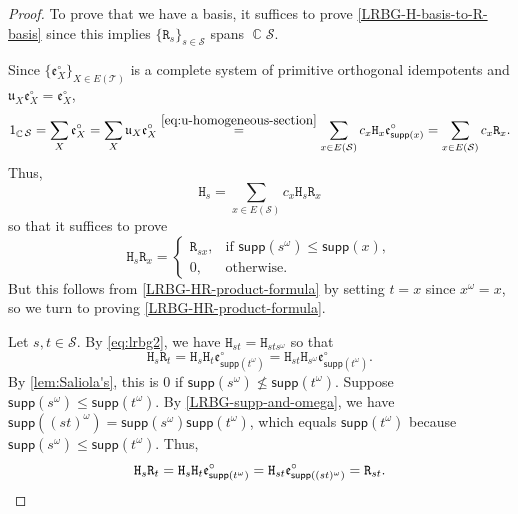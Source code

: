 \documentclass[11pt, oneside, reqno]{amsart}
\theoremstyle{definition}
\numberwithin{equation}{section}
\DeclareMathOperator{\C}{\mathbb{C}}
\def \SS{{\mathcal{S}}}
\def \TT{{\mathcal{T}}}
\def \kk{\C}
\def \uu{{\mathfrak{u}}}
\def \ee{{\mathfrak{e}}}
\def \supp{\mathsf{supp}}
\newcommand{\B}[1]{\mathtt{#1}} 			%
\begin{document}
\begin{proof}
    To prove that we have a basis, it suffices to prove
    \cref{LRBG-H-basis-to-R-basis} since this implies $\{\B{R}_s\}_{ s \in \SS}$
    spans $\kk\SS$.

    Since $\{\ee^\circ_{X}\}_{X \in E(\TT)}$ is a complete system of primitive orthogonal idempotents
    and $\uu_{X} \ee^\circ_{X} = \ee^\circ_{X}$,
    \begin{equation*}
        1_{\kk\SS}
        = \sum_{X} \ee^\circ_{X}
        = \sum_{X} \uu_{X} \ee^\circ_{X}
        \overset{\cref{eq:u-homogeneous-section}}{=}
        \sum_{x \in E(\SS)} c_x \B{H}_{x} \ee^\circ_{\supp(x)}
        =
        \sum_{x \in E(\SS)} c_x \B{R}_{x}.
    \end{equation*}
    Thus,
    \begin{equation*}
        \B{H}_{s}
        = \sum_{x \in E(\SS)} c_x \B{H}_{s} \B{R}_{x}
    \end{equation*}
    so that it suffices to prove
    \begin{equation*}
        \B{H}_{s} \B{R}_{x} =
        \begin{cases}
            \B{R}_{sx}, & \text{if~} \supp(s^\omega) \leq \supp(x), \\
            0, & \text{otherwise}.
        \end{cases}
    \end{equation*}
    But this follows from \cref{LRBG-HR-product-formula} by setting $t = x$
    since $x^\omega = x$, so we turn to proving \cref{LRBG-HR-product-formula}.

    Let $s, t \in \SS$.
    By \cref{eq:lrbg2}, we have $\B{H}_{s t} = \B{H}_{s t s^\omega}$
    so that
    \begin{equation*}
        \B{H}_{s} \B{R}_{t}
        =
        \B{H}_{s} \B{H}_{t} \ee^\circ_{\supp(t^\omega)}
        =
        \B{H}_{st} \B{H}_{s^\omega} \ee^\circ_{\supp(t^\omega)}.
    \end{equation*}
    By \cref{lem:Saliola's},
    this is $0$ if $\supp(s^\omega) \not\leq \supp(t^\omega)$.
    Suppose $\supp(s^\omega) \leq \supp(t^\omega)$.
    By \cref{LRBG-supp-and-omega},
    we have
    $\supp\left((st)^\omega\right) = \supp(s^\omega) \supp(t^\omega)$,
    which equals $\supp(t^\omega)$ because
    $\supp(s^\omega) \leq \supp(t^\omega)$.
    Thus,
    \begin{equation*}
        \B{H}_{s} \B{R}_{t}
        = \B{H}_{s} \B{H}_{t} \ee^\circ_{\supp(t^\omega)}
        = \B{H}_{st} \ee^\circ_{\supp((st)^\omega)}
        = \B{R}_{st}.
        \qedhere
    \end{equation*}
\end{proof}
\end{document}
